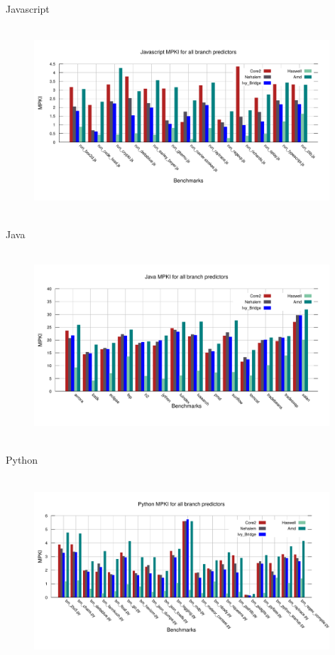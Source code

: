 \documentclass[10pt]{beamer}
\begin{document}
\begin{frame}{Javascript}
    \begin{figure}[t]
        \centering
        \includegraphics[width=11cm, height=7cm]{figures/javascript_MPKI.pdf}
    \end{figure}
\end{frame}

\begin{frame}{Java}
    \begin{figure}[t]
        \centering
        \includegraphics[width=11cm, height=7cm]{figures/java_MPKI.pdf}
    \end{figure}
\end{frame}

\begin{frame}{Python}
    \begin{figure}[t]
        \centering
        \includegraphics[width=11cm, height=7cm]{figures/python_MPKI.pdf}
    \end{figure}
\end{frame}
\end{document}
